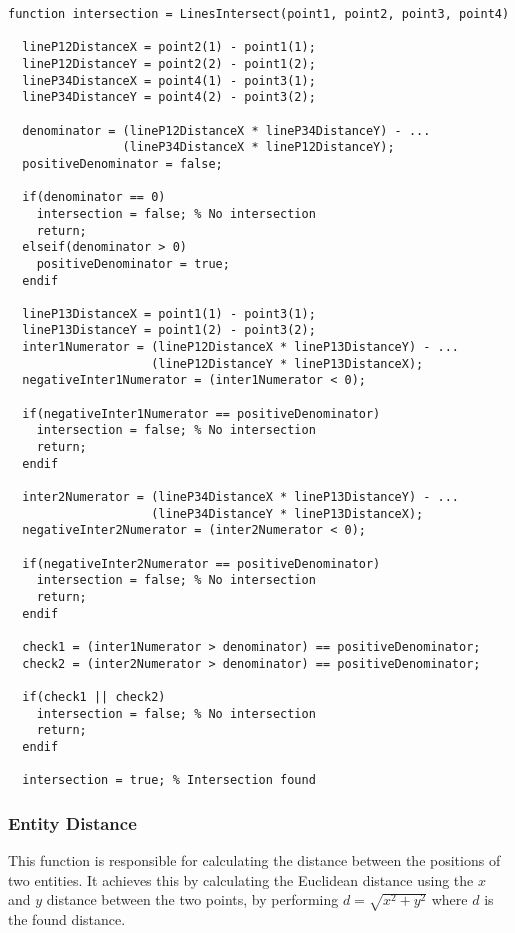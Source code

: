 \documentclass[11pt]{article}
\begin{document}
\begin{lstlisting}
function intersection = LinesIntersect(point1, point2, point3, point4)
  
  lineP12DistanceX = point2(1) - point1(1);
  lineP12DistanceY = point2(2) - point1(2);
  lineP34DistanceX = point4(1) - point3(1);
  lineP34DistanceY = point4(2) - point3(2);
  
  denominator = (lineP12DistanceX * lineP34DistanceY) - ...
                (lineP34DistanceX * lineP12DistanceY);
  positiveDenominator = false;
  
  if(denominator == 0)
    intersection = false; % No intersection
    return;
  elseif(denominator > 0)
    positiveDenominator = true;
  endif
  
  lineP13DistanceX = point1(1) - point3(1);
  lineP13DistanceY = point1(2) - point3(2);
  inter1Numerator = (lineP12DistanceX * lineP13DistanceY) - ...
                    (lineP12DistanceY * lineP13DistanceX);
  negativeInter1Numerator = (inter1Numerator < 0);
  
  if(negativeInter1Numerator == positiveDenominator)
    intersection = false; % No intersection
    return;
  endif
  
  inter2Numerator = (lineP34DistanceX * lineP13DistanceY) - ... 
                    (lineP34DistanceY * lineP13DistanceX);
  negativeInter2Numerator = (inter2Numerator < 0);
  
  if(negativeInter2Numerator == positiveDenominator)
    intersection = false; % No intersection
    return;
  endif
  
  check1 = (inter1Numerator > denominator) == positiveDenominator;
  check2 = (inter2Numerator > denominator) == positiveDenominator;
  
  if(check1 || check2)
    intersection = false; % No intersection
    return;
  endif
 
  intersection = true; % Intersection found

\end{lstlisting}

\subsubsection{Entity Distance}

This function is responsible for calculating the distance between the positions of two entities. It achieves this by calculating the Euclidean distance using the $x$ and $y$ distance between the two points, by performing $d = \sqrt{x^2 + y^2}$ where $d$ is the found distance.
\end{document}
